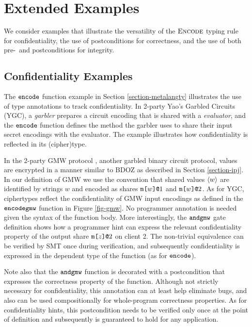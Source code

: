 \section{Extended Examples}
\label{section-examples}

We consider examples that illustrate the versatility of the $\text{\sc Encode}$
typing rule for confidentiality, the use of postconditions for correctness,
and the use of both pre-~and postconditions for integrity. 

\subsection{Confidentiality Examples}



The $\texttt{encode}$ function example in Section \ref{section-metalangty}
illustrates the use of type annotations to track confidentiality. In
2-party Yao's Garbled Circuits (YGC), a \emph{garbler} prepares a circuit encoding
that is shared with a \emph{evaluator}, and the $\texttt{encode}$ function
defines the method the garbler uses to share their input secret encodings
with the evaluator. The example illustrates how confidentiality is reflected
in its (cipher)type.

In the 2-party GMW protocol \cite{evans2018pragmatic}, another garbled
binary circuit protocol, values are encrypted in a manner similar
to BDOZ as described in Section \ref{section-ipj}. In our definition
of GMW we use the convention that shared values $\langle w \rangle$ are identified by
strings $w$ and encoded as shares $\texttt{m[}w\texttt{]}\texttt{@}1$ and $\texttt{m[}w\texttt{]}\texttt{@}2$.  As for
YGC, ciphertypes reflect the confidentiality of GMW input encodings as
defined in the $\texttt{encodegmw}$ function in Figure \ref{fig-gmw}. No
programmer annotation is needed given the syntax of the function
body. More interestingly, the $\texttt{andgmw}$ gate definition shows how
a programmer hint can express the relevant confidentiality property of
the output share $\texttt{m[}z\texttt{]}\texttt{@}2$ on client 2. The non-trivial equivalence
can be verified by SMT once during verification, and subsequently
confidentiality is expressed in the dependent type of the function
(as for $\texttt{encode}$).

Note also that the $\texttt{andgmw}$ function is decorated with a
postcondition that expresses the correctness property of the
function. Although not strictly necessary for confidentiality, this
annotation can at least help eliminate bugs, and also can be used
compositionally for whole-program correctness properties. As for
confidentiality hints, this postcondition needs to be verified only
once at the point of definition and subsequently is guaranteed to hold
for any application.

